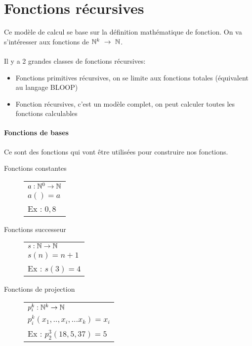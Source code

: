 \section{Fonctions récursives}
\label{sub:fonction_r_cursives}
Ce modèle de calcul se base sur la définition mathématique de fonction. On va
s'intéresser aux fonctions de $\mathbb{N}^k \ \rightarrow \ \mathbb{N}$.

\paragraph{} Il y a 2 grandes classes de fonctions récursives:
\begin{itemize}
	\item Fonctions primitives récursives, on se limite aux fonctions totales
		(équivalent au langage BLOOP)
	\item Fonction récursives, c'est un modèle complet, on peut calculer
		toutes les fonctions calculables
\end{itemize}

\paragraph{Fonctions de bases} Ce sont des fonctions qui vont être utilisées
pour construire nos fonctions.

\begin{description}
	\item[Fonctions constantes]
		\begin{tabular}{|l|}
			\hline
			$a: \mathbb{N}^0 \rightarrow \mathbb{N}$\\
			$a() = a$\\
			Ex : $0,8$\\
			\hline
		\end{tabular}
	\item[Fonctions successeur]
		\begin{tabular}{|l|}
			\hline
			$s: \mathbb{N} \rightarrow \mathbb{N}$\\
			$s(n) = n + 1$\\
			Ex : $s(3) = 4$\\
			\hline
		\end{tabular}
	\item[Fonctions de projection]
		\begin{tabular}{|l|}
			\hline
			$p^k_i: \mathbb{N}^k \rightarrow \mathbb{N}$\\
			$p^k_i(x_1,..,x_i,...x_k) = x_i$\\
			Ex : $p^3_2(18,5,37) = 5$\\
			\hline
		\end{tabular}
\end{description}


